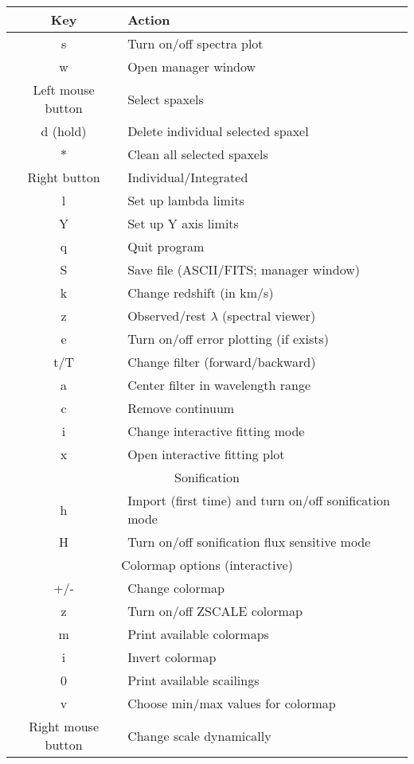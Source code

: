 \documentclass[11pt]{article}
\begin{document}
\centering
\setlength{\tabcolsep}{1cm}
\begin{tabular} {c l}
\hline
\rowcolor{MilkTea!25!white}
Key & Action \\
\hline
s & Turn on/off spectra plot\\
w & Open manager window \\
Left mouse button & Select spaxels \\
d (hold) & Delete individual selected spaxel \\
$*$ & Clean all selected spaxels\\
Right button & Individual/Integrated \\
l & Set up lambda limits\\
Y & Set up Y axis limits\\
q & Quit program\\
S & Save file (ASCII/FITS; manager window) \\
k & Change redshift (in km/s) \\
z & Observed/rest $\lambda$ (spectral viewer) \\
e & Turn on/off error plotting (if exists) \\
t/T &  Change filter (forward/backward) \\
a & Center filter in wavelength range \\
c & Remove continuum \\
i & Change interactive fitting mode \\
x & Open interactive fitting plot \\
\multicolumn{2}{c}{\cellcolor{MilkTea!25!white} Sonification} \\
h & Import (first time) and turn on/off sonification mode \\ 
H & Turn on/off sonification flux sensitive mode \\
\multicolumn{2}{c}{\cellcolor{MilkTea!25!white} Colormap options (interactive)} \\
+/- & Change colormap \\
z & Turn on/off ZSCALE colormap\\
m & Print available colormaps \\
i & Invert colormap \\
0 & Print available scailings \\
v & Choose min/max values for colormap \\
Right mouse button & Change scale dynamically\\

\end{tabular}
\end{document}

